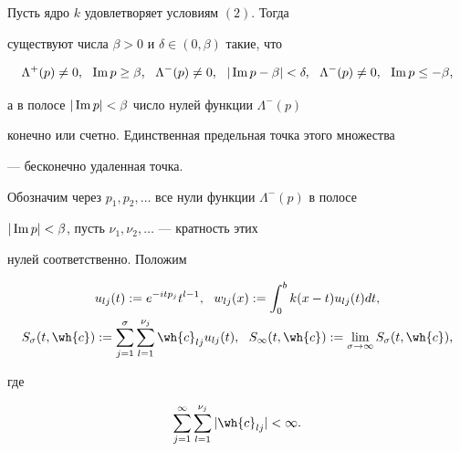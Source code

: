 \begin{lemnonum}


Пусть ядро $k$ удовлетворяет условиям $(2)$. Тогда


существуют числа $\beta > 0$ и $\delta \in (0,\beta)$ такие, что


\begin{equation}


\Lambda^+(p)\neq 0,\ \ \im p\geq \beta,\ \


\Lambda^-(p)\neq 0,\ \ |\im p- \beta|<\delta,\ \


\Lambda^-(p)\neq 0,\ \ \im p\leq -\beta,


\end{equation}


а в полосе $|\operatorname{Im} p|< \beta$ число нулей функции $\Lambda^-(p)$ 


конечно или счетно. Единственная предельная точка этого множества


--- бесконечно удаленная точка.


\end{lemnonum}





Обозначим через $p_1,p_2,\dotsc$ все нули функции $\Lambda^-(p)$ в полосе


$|\operatorname{Im} p|<\beta$, пусть $\nu_1,\nu_2,\dotsc$ --- кратность этих


нулей соответственно. Положим


\begin{gather}


u_{lj}(t):=e^{-itp_j}t^{l-1},\ \


w_{lj}(x):=\int_0^bk(x-t)u_{lj}(t)dt,\notag \\


%


S_\sigma(t,\wh{c}):=\sum _{j=1}^{\sigma}


\sum_{l=1}^{\nu_j}\wh{c}_{lj}u_{lj}(t),\ \


S_\infty (t,\wh{c}):=\lim_{\sigma \to \infty}S_\sigma(t,\wh{c}),


\end{gather}


где


\begin{equation}


\sum _{j=1}^{\infty}


\sum_{l=1}^{\nu_j}|\wh{c}_{lj}|<\infty.


\end{equation}





